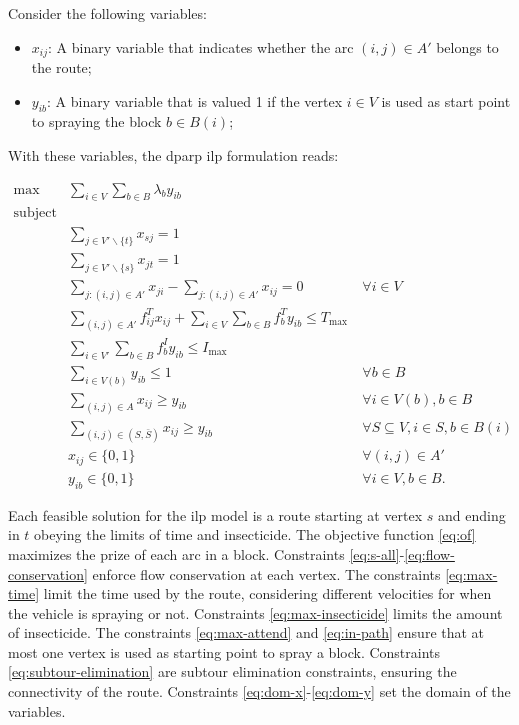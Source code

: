 \documentclass[a4paper,11pt]{article}
\begin{document}
Consider the following variables:

\begin{itemize}
  \item $x_{ij}$: A binary variable that indicates whether the arc $(i, j) \in
    A'$ belongs to the route;
  \item $y_{ib}$: A binary variable that is valued 1 if the vertex $i \in V$ is
    used as start point to spraying the block $b \in B(i)$; 
\end{itemize}
With these variables, the \gls{dparp} \gls{ilp} formulation reads:

\begin{align}
  \max & \sum_{i \in V} \sum_{b \in B} \lambda_b y_{ib} & \label{eq:of}\\
  \nonumber \text{subject to:} & & \\
       & \sum_{j \in V'\backslash \{t\}} x_{sj} = 1 & \label{eq:s-all} \\
       & \sum_{j \in V'\backslash \{s\}} x_{jt} = 1 & \label{eq:all-t} \\
       & \sum_{j: (i, j) \in A'} x_{ji} - \sum_{j: (i, j) \in A'} x_{ij} = 0 & \ \forall i \in V \label{eq:flow-conservation} \\
       & \sum_{(i, j) \in A'} f^T_{ij} x_{ij} + \sum_{i \in V} \sum_{b \in B} f^T_b y_{ib} \leq T_{\max} & \label{eq:max-time} \\
       & \sum_{i \in V'} \sum_{b \in B} f^I_b y_{ib} \leq I_{\max} & \label{eq:max-insecticide} \\
       & \sum_{i \in V(b)} y_{ib} \leq 1 & \ \forall b \in B \label{eq:max-attend} \\
       & \sum_{(i, j) \in A} x_{ij} \geq y_{ib} & \ \forall i \in V(b), b \in B \label{eq:in-path} \\
       & \sum_{(i, j) \in (S, \bar{S})} x_{ij} \geq y_{ib} & \ \forall S \subseteq V, i \in S, b \in B(i) \label{eq:subtour-elimination} \\
       & x_{ij} \in \{0, 1\} & \ \forall (i, j) \in A' \label{eq:dom-x} \\
       & y_{ib} \in \{0, 1\} & \ \forall i \in V, b \in B. \label{eq:dom-y} 
\end{align}

Each feasible solution for the \gls{ilp} model is a route starting at vertex $s$
and ending  in $t$  obeying the  limits of time  and insecticide.  The objective
function \eqref{eq:of} maximizes  the prize of each arc in  a block. Constraints
\eqref{eq:s-all}-\eqref{eq:flow-conservation} enforce flow  conservation at each
vertex. The  constraints \eqref{eq:max-time} limit  the time used by  the route,
considering  different velocities  for  when  the vehicle  is  spraying or  not.
Constraints  \eqref{eq:max-insecticide} limits  the amount  of insecticide.  The
constraints \eqref{eq:max-attend} and \eqref{eq:in-path} ensure that at most one
vertex   is   used  as   starting   point   to   spray  a   block.   Constraints
\eqref{eq:subtour-elimination} are subtour elimination constraints, ensuring the
connectivity of the route. Constraints \eqref{eq:dom-x}-\eqref{eq:dom-y} set the
domain of the variables. \newline
\end{document}
